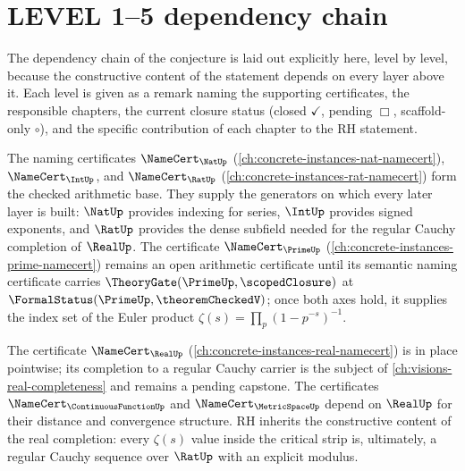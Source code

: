 \section{LEVEL 1--5 dependency chain}
\label{sec:rh-dependency-chain}

The dependency chain of the conjecture is laid out explicitly here, level by level, because the constructive content of the statement depends on every layer above it. Each level is given as a remark naming the supporting certificates, the responsible chapters, the current closure status (closed $\checkmark$, pending $\Box$, scaffold-only $\circ$), and the specific contribution of each chapter to the RH statement.

\begin{remark}
\label{rem:rh-level-1}
The naming certificates $\NameCert_{\NatUp}$ (\autoref{ch:concrete-instances-nat-namecert}), $\NameCert_{\IntUp}$, and $\NameCert_{\RatUp}$ (\autoref{ch:concrete-instances-rat-namecert}) form the checked arithmetic base. They supply the generators on which every later layer is built: $\NatUp$ provides indexing for series, $\IntUp$ provides signed exponents, and $\RatUp$ provides the dense subfield needed for the regular Cauchy completion of $\RealUp$. The certificate $\NameCert_{\PrimeUp}$ (\autoref{ch:concrete-instances-prime-namecert}) remains an open arithmetic certificate until its semantic naming certificate carries $\TheoryGate(\PrimeUp, \scopedClosure)$ at $\FormalStatus(\PrimeUp, \theoremCheckedV)$; once both axes hold, it supplies the index set of the Euler product $\zeta(s) = \prod_{p} (1 - p^{-s})^{-1}$.
\end{remark}

\begin{remark}
\label{rem:rh-level-2}
The certificate $\NameCert_{\RealUp}$ (\autoref{ch:concrete-instances-real-namecert}) is in place pointwise; its completion to a regular Cauchy carrier is the subject of \autoref{ch:visions-real-completeness} and remains a pending capstone. The certificates $\NameCert_{\ContinuousFunctionUp}$ and $\NameCert_{\MetricSpaceUp}$ depend on $\RealUp$ for their distance and convergence structure. RH inherits the constructive content of the real completion: every $\zeta(s)$ value inside the critical strip is, ultimately, a regular Cauchy sequence over $\RatUp$ with an explicit modulus.
\end{remark}

